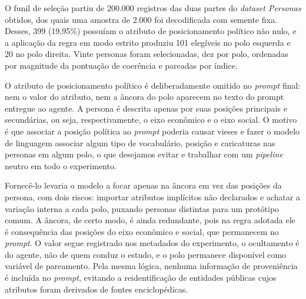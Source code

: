 O funil de seleção partiu de 200.000 registros das duas partes do \textit{dataset Personas}
obtidos, dos quais uma amostra de 2.000 foi decodificada com semente fixa.
Desses, 399 (19,95\%) possuíam o atributo de posicionamento político não nulo,
e a aplicação da regra em modo estrito produziu 101 elegíveis no polo esquerda
e 20 no polo direita. Vinte personas foram selecionadas, dez por polo,
ordenadas por magnitude da pontuação de coerência e pareadas por índice.

O atributo de posicionamento político é deliberadamente omitido no
\textit{prompt} final: nem o valor do atributo, nem a âncora do polo aparecem no texto do prompt
entregue ao agente. A persona é descrita apenas por suas posições principais e secundárias, ou seja, respectivamente, o eixo econômico e o eixo social. O motivo é que associar a posição política ao \textit{prompt} poderia causar vieses e fazer o modelo de linguagem associar algum tipo de vocabulário, posição e caricaturas nas personas em algum polo, o que desejamos evitar e trabalhar com um \textit{pipeline} neutro em todo o experimento.


Fornecê-lo levaria o modelo a focar apenas na âncora em vez das posições da persona, com dois riscos: importar atributos implícitos não declarados e achatar a variação interna a cada polo, puxando personas distintas para um protótipo comum. A âncora, de certo modo, é ainda redundante, pois na regra adotada ele é consequência das posições do eixo econômico e social, que
permanecem no \textit{prompt}. O valor segue registrado nos metadados do experimento, o
ocultamento é do agente, não de quem conduz o estudo, e o polo permanece
disponível como variável de pareamento. Pela mesma lógica, nenhuma informação
de proveniência é incluída no \textit{prompt}, evitando a reidentificação de entidades
públicas cujos atributos foram derivados de fontes enciclopédicas.